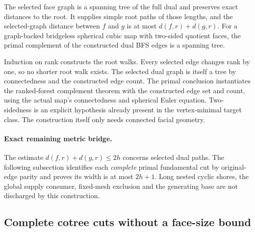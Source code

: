 \begin{theorem}
The selected face graph is a spanning tree of the full dual and preserves exact distances to
the root.  It supplies simple root paths of those lengths, and the
selected-graph distance between $f$ and $g$ is at most
$d(f,r)+d(g,r)$.  For a graph-backed bridgeless spherical cubic map with
two-sided quotient faces, the primal complement of the constructed
dual BFS edges is a spanning tree.
\end{theorem}

Induction on rank constructs the root walks.  Every selected edge changes
rank by one, so no shorter root walk exists.  The selected dual graph is
itself a tree by connectedness and the constructed edge count.  The primal conclusion
instantiates the ranked-forest complement theorem with the constructed
edge set and count, using the actual map's connectedness and spherical
Euler equation.  Two-sidedness is an explicit hypothesis already present
in the vertex-minimal target class.  The construction itself only needs
connected facial geometry.

\paragraph{Exact remaining metric bridge.}
The estimate $d(f,r)+d(g,r)\leq 2h$ concerns selected dual paths.
The following subsection identifies each \emph{complete} primal
fundamental cut by original-edge parity and proves its width is at most
$2h+1$.  Long nested cyclic shores, the global supply
consumer, fixed-mesh exclusion and the generating base are not discharged
by this construction.

\subsection{Complete cotree cuts without a face-size bound}
\label{sec:complete-cotree-cuts}

